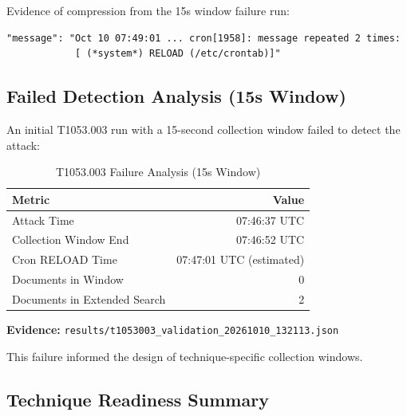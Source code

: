 \documentclass[11pt,a4paper]{article}
\begin{document}
Evidence of compression from the 15s window failure run:
\begin{lstlisting}
"message": "Oct 10 07:49:01 ... cron[1958]: message repeated 2 times:
            [ (*system*) RELOAD (/etc/crontab)]"
\end{lstlisting}

\subsection{Failed Detection Analysis (15s Window)}

An initial T1053.003 run with a 15-second collection window failed to detect the attack:

\begin{table}[H]
    \centering
    \caption{T1053.003 Failure Analysis (15s Window)}
    \begin{tabular}{lr}
        \toprule
        \textbf{Metric} & \textbf{Value} \\
        \midrule
        Attack Time & 07:46:37 UTC \\
        Collection Window End & 07:46:52 UTC \\
        Cron RELOAD Time & 07:47:01 UTC (estimated) \\
        Documents in Window & 0 \\
        Documents in Extended Search & 2 \\
        \bottomrule
    \end{tabular}
\end{table}

\textbf{Evidence:} \texttt{results/t1053003\_validation\_20261010\_132113.json}

This failure informed the design of technique-specific collection windows.

\subsection{Technique Readiness Summary}
\end{document}
